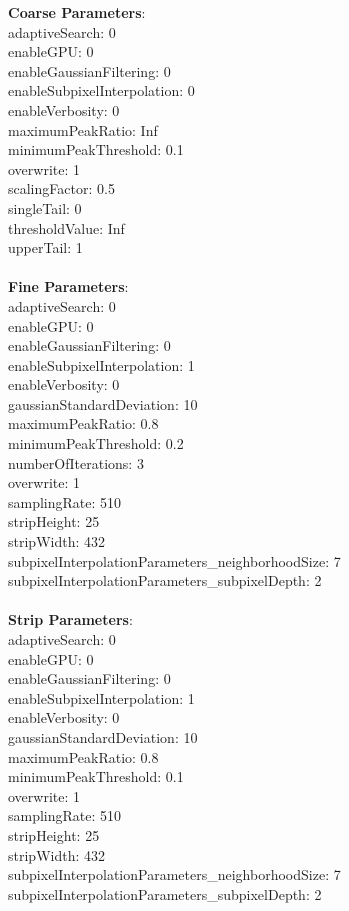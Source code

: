\documentclass[11pt]{article}
\begin{document}
\textbf{Coarse Parameters}: \\
adaptiveSearch: 0\\
enableGPU: 0\\
enableGaussianFiltering: 0\\
enableSubpixelInterpolation: 0\\
enableVerbosity: 0\\
maximumPeakRatio: Inf\\
minimumPeakThreshold: 0.1\\
overwrite: 1\\
scalingFactor: 0.5\\
singleTail: 0\\
thresholdValue: Inf\\
upperTail: 1\\
\\
\textbf{Fine Parameters}: \\
adaptiveSearch: 0\\
enableGPU: 0\\
enableGaussianFiltering: 0\\
enableSubpixelInterpolation: 1\\
enableVerbosity: 0\\
gaussianStandardDeviation: 10\\
maximumPeakRatio: 0.8\\
minimumPeakThreshold: 0.2\\
numberOfIterations: 3\\
overwrite: 1\\
samplingRate: 510\\
stripHeight: 25\\
stripWidth: 432\\
subpixelInterpolationParameters\_neighborhoodSize: 7\\
subpixelInterpolationParameters\_subpixelDepth: 2\\
\\
\textbf{Strip Parameters}: \\
adaptiveSearch: 0\\
enableGPU: 0\\
enableGaussianFiltering: 0\\
enableSubpixelInterpolation: 1\\
enableVerbosity: 0\\
gaussianStandardDeviation: 10\\
maximumPeakRatio: 0.8\\
minimumPeakThreshold: 0.1\\
overwrite: 1\\
samplingRate: 510\\
stripHeight: 25\\
stripWidth: 432\\
subpixelInterpolationParameters\_neighborhoodSize: 7\\
subpixelInterpolationParameters\_subpixelDepth: 2\\
\\
\newpage
\end{document}
